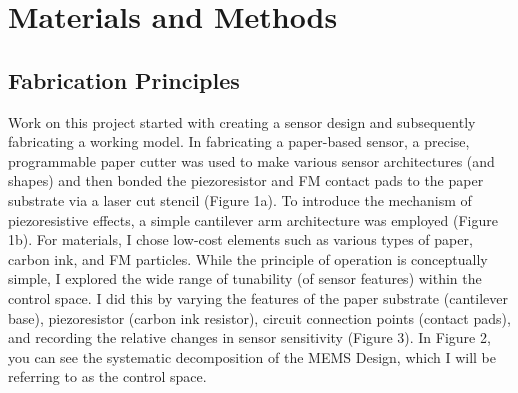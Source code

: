 \documentclass[12pt]{article}
\begin{document}
\pagebreak
\section{Materials and Methods}
  


\subsection{Fabrication Principles}
Work on this project started with creating a sensor design and subsequently fabricating a working model. In fabricating a paper-based sensor, a precise, programmable paper cutter was used to make various sensor architectures (and shapes) and then bonded the piezoresistor and FM contact pads to the paper substrate via a laser cut stencil (Figure 1a). To introduce the mechanism of piezoresistive effects, a simple cantilever arm architecture was employed (Figure 1b). For materials, I chose low-cost elements such as various types of paper, carbon ink, and FM particles. While the principle of operation is conceptually simple, I explored the wide range of tunability (of sensor features) within the control space. I did this by varying the features of the paper substrate (cantilever base), piezoresistor (carbon ink resistor), circuit connection points (contact pads), and recording the relative changes in sensor sensitivity (Figure 3). In Figure 2, you can see the systematic decomposition of the MEMS Design, which I will be referring to as the control space. 
\end{document}
